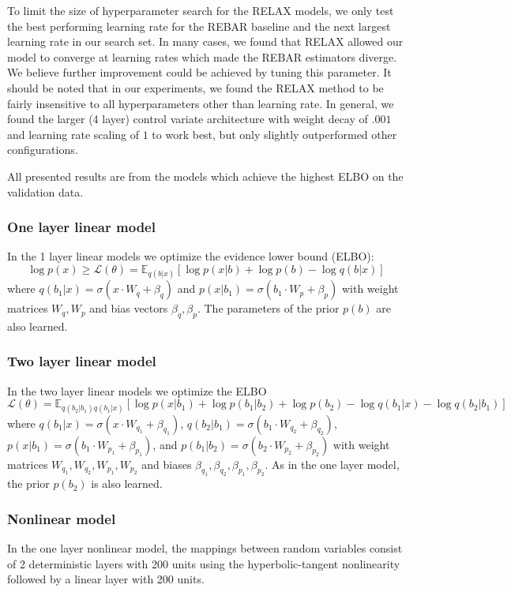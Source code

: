 \documentclass{article}
\newcommand{\E}{\mathbb{E}}
\begin{document}
To limit the size of hyperparameter search for the RELAX models, we only test the best performing learning rate for the REBAR baseline and the next largest learning rate in our search set.
In many cases, we found that RELAX allowed our model to converge at learning rates which made the REBAR estimators diverge.
We believe further improvement could be achieved by tuning this parameter. It should be noted that in our experiments, we found the RELAX method to be fairly insensitive to all hyperparameters other than learning rate. In general, we found the larger (4 layer) control variate architecture with weight decay of $.001$ and learning rate scaling of $1$ to work best, but only slightly outperformed other configurations.  

All presented results are from the models which achieve the highest ELBO on the validation data.
\label{app_disc_vae}
\subsubsection{One layer linear model}
In the 1 layer linear models we optimize the evidence lower bound (ELBO): $$\log p(x) \geq \mathcal{L}(\theta) = \E_{q(b|x)}[\log p(x|b) + \log p(b) - \log q(b|x)]$$ where $q(b_1|x) = \sigma(x\cdot W_q + \beta_q)$ and $p(x| b_1) = \sigma(b_1\cdot W_p + \beta_p)$ with weight matrices $W_q,W_p$ and bias vectors $\beta_q,\beta_p$.
The parameters of the prior $p(b)$ are also learned.


\subsubsection{Two layer linear model}
In the two layer linear models we optimize the ELBO $$\mathcal{L}(\theta) = \E_{q(b_2|b_1)q(b_1|x)}[\log p(x|b_1) + \log p(b_1|b_2) + \log p(b_2) - \log q(b_1|x) - \log q(b_2|b_1)]$$ where $q(b_1|x) = \sigma(x\cdot W_{q_1} + \beta_{q_1})$, $q(b_2|b_1) = \sigma(b_1\cdot W_{q_2} + \beta_{q_2})$, $p(x| b_1) = \sigma(b_1\cdot W_{p_1} + \beta_{p_1})$, and $p(b_1| b_2) = \sigma(b_2\cdot W_{p_2} + \beta_{p_2})$ with weight matrices $W_{q_1},W_{q_2},W_{p_1},W_{p_2}$ and biases $\beta_{q_1},\beta_{q_2},\beta_{p_1},\beta_{p_2}$. As in the one layer model, the prior $p(b_2)$ is also learned.

\subsubsection{Nonlinear model}
In the one layer nonlinear model, the mappings between random variables consist of 2 deterministic layers with 200 units using the hyperbolic-tangent nonlinearity followed by a linear layer with 200 units. 
\end{document}
